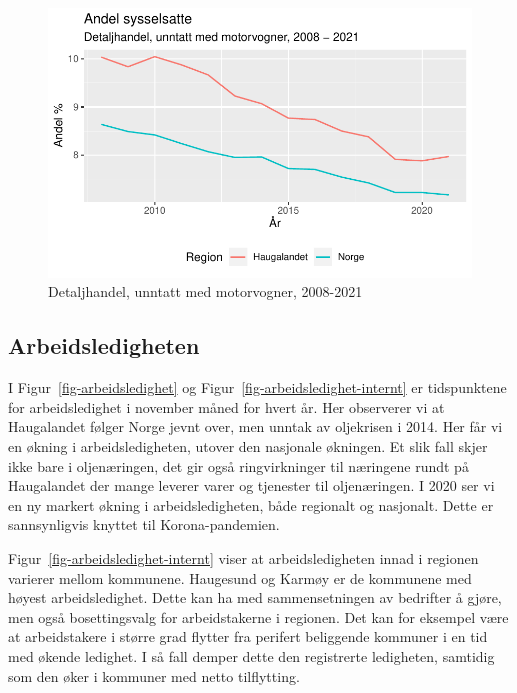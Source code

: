 \documentclass[
]{article}
\begin{document}
\begin{figure}[H]

{\centering \includegraphics{Masteroppgave_files/figure-pdf/fig-detaljhandel-1.pdf}

}

\caption{\label{fig-detaljhandel}Detaljhandel, unntatt med motorvogner,
2008-2021}

\end{figure}

\hypertarget{arbeidsledigheten}{%
\subsection{Arbeidsledigheten}\label{arbeidsledigheten}}

I Figur~\ref{fig-arbeidsledighet} og
Figur~\ref{fig-arbeidsledighet-internt} er tidspunktene for
arbeidsledighet i november måned for hvert år. Her observerer vi at
Haugalandet følger Norge jevnt over, men unntak av oljekrisen i 2014.
Her får vi en økning i arbeidsledigheten, utover den nasjonale økningen.
Et slik fall skjer ikke bare i oljenæringen, det gir også ringvirkninger
til næringene rundt på Haugalandet der mange leverer varer og tjenester
til oljenæringen. I 2020 ser vi en ny markert økning i
arbeidsledigheten, både regionalt og nasjonalt. Dette er sannsynligvis
knyttet til Korona-pandemien.

Figur~\ref{fig-arbeidsledighet-internt} viser at arbeidsledigheten innad
i regionen varierer mellom kommunene. Haugesund og Karmøy er de
kommunene med høyest arbeidsledighet. Dette kan ha med sammensetningen
av bedrifter å gjøre, men også bosettingsvalg for arbeidstakerne i
regionen. Det kan for eksempel være at arbeidstakere i større grad
flytter fra perifert beliggende kommuner i en tid med økende ledighet. I
så fall demper dette den registrerte ledigheten, samtidig som den øker i
kommuner med netto tilflytting.
\end{document}
